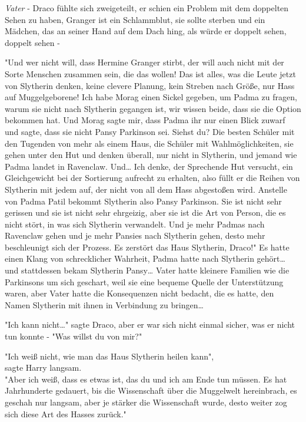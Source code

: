 {\emph{Vater} - Draco fühlte sich zweigeteilt, er schien ein Problem mit dem doppelten Sehen zu haben, Granger ist ein Schlammblut, sie sollte sterben und ein Mädchen, das an seiner Hand auf dem Dach hing, als würde er doppelt sehen, doppelt sehen -

"Und wer nicht will, dass Hermine Granger stirbt, der will auch nicht mit der Sorte Menschen zusammen sein, die das wollen! Das ist alles, was die Leute jetzt von Slytherin denken, keine clevere Planung, kein Streben nach Größe, nur Hass auf Muggelgeborene! Ich habe Morag einen Sickel gegeben, um Padma zu fragen, warum sie nicht nach Slytherin gegangen ist, wir wissen beide, dass sie die Option bekommen hat. Und Morag sagte mir, dass Padma ihr nur einen Blick zuwarf und sagte, dass sie nicht Pansy Parkinson sei. Siehst du? Die besten Schüler mit den Tugenden von mehr als einem Haus, die Schüler mit Wahlmöglichkeiten, sie gehen unter den Hut und denken überall, nur nicht in Slytherin, und jemand wie Padma landet in Ravenclaw. Und… Ich denke, der Sprechende Hut versucht, ein Gleichgewicht bei der Sortierung aufrecht zu erhalten, also füllt er die Reihen von Slytherin mit jedem auf, der nicht von all dem Hass abgestoßen wird. Anstelle von Padma Patil bekommt Slytherin also Pansy Parkinson. Sie ist nicht sehr gerissen und sie ist nicht sehr ehrgeizig, aber sie ist die Art von Person, die es nicht stört, in was sich Slytherin verwandelt. Und je mehr Padmas nach Ravenclaw gehen und je mehr Pansies nach Slytherin gehen, desto mehr beschleunigt sich der Prozess. Es zerstört das Haus Slytherin, Draco!" Es hatte einen Klang von schrecklicher Wahrheit, Padma hatte nach Slytherin gehört… und stattdessen bekam Slytherin Pansy… Vater hatte kleinere Familien wie die Parkinsons um sich geschart, weil sie eine bequeme Quelle der Unterstützung waren, aber Vater hatte die Konsequenzen nicht bedacht, die es hatte, den Namen Slytherin mit ihnen in Verbindung zu bringen…

"Ich kann nicht…" sagte Draco, aber er war sich nicht einmal sicher, was er nicht tun konnte - "Was willst du von mir?"

"Ich weiß nicht, wie man das Haus Slytherin heilen kann",\\ sagte Harry langsam.\\ "Aber ich weiß, dass es etwas ist, das du und ich am Ende tun müssen. Es hat Jahrhunderte gedauert, bis die Wissenschaft über die Muggelwelt hereinbrach, es geschah nur langsam, aber je stärker die Wissenschaft wurde, desto weiter zog sich diese Art des Hasses zurück."

}
